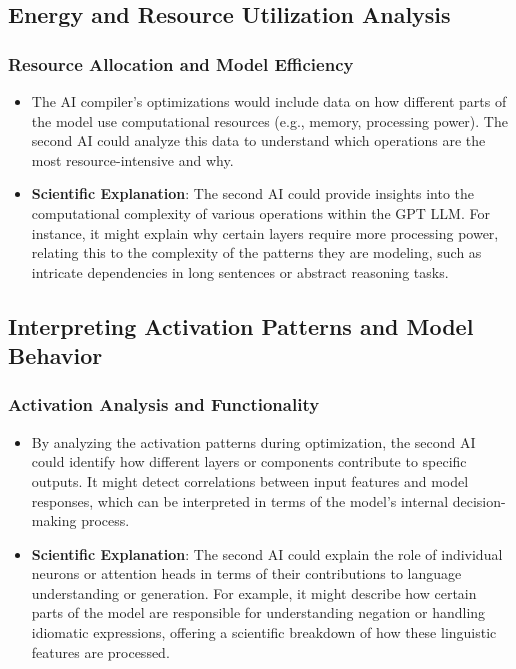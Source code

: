 \documentclass{article}
\begin{document}
\subsection{Energy and Resource Utilization Analysis}
\subsubsection{Resource Allocation and Model Efficiency}
\begin{itemize}
    \item The AI compiler’s optimizations would include data on how different parts of the model use computational resources (e.g., memory, processing power). The second AI could analyze this data to understand which operations are the most resource-intensive and why.
    \item \textbf{Scientific Explanation}: The second AI could provide insights into the computational complexity of various operations within the GPT LLM. For instance, it might explain why certain layers require more processing power, relating this to the complexity of the patterns they are modeling, such as intricate dependencies in long sentences or abstract reasoning tasks.
\end{itemize}

\subsection{Interpreting Activation Patterns and Model Behavior}
\subsubsection{Activation Analysis and Functionality}
\begin{itemize}
    \item By analyzing the activation patterns during optimization, the second AI could identify how different layers or components contribute to specific outputs. It might detect correlations between input features and model responses, which can be interpreted in terms of the model’s internal decision-making process.
    \item \textbf{Scientific Explanation}: The second AI could explain the role of individual neurons or attention heads in terms of their contributions to language understanding or generation. For example, it might describe how certain parts of the model are responsible for understanding negation or handling idiomatic expressions, offering a scientific breakdown of how these linguistic features are processed.
\end{itemize}
\end{document}
